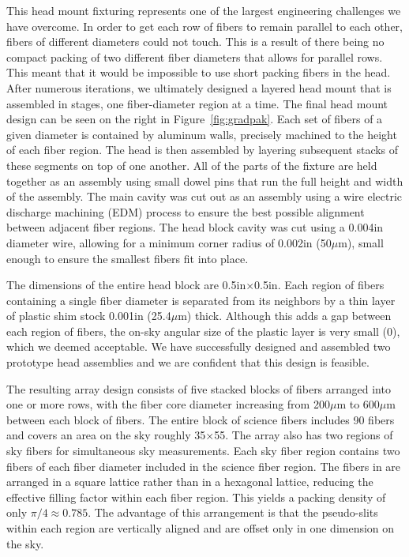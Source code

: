 This head mount fixturing represents one of the largest engineering challenges
we have overcome.  In order to get each row of fibers to remain parallel to
each other, fibers of different diameters could not touch.  This is a result
of there being no compact packing of two different fiber diameters that allows
for parallel rows.  This meant that it would be impossible to use short
packing fibers in the \GP head.  After numerous iterations, we ultimately
designed a layered head mount that is assembled in stages, one fiber-diameter
region at a time.  The final head mount design can be seen on the right in
Figure~\ref{fig:gradpak}.  Each set of fibers of a given diameter is contained
by aluminum walls, precisely machined to the height of each fiber region.  The
head is then assembled by layering subsequent stacks of these segments on top
of one another.  All of the parts of the fixture are held together as an
assembly using small dowel pins that run the full height and width of the
assembly.  The main cavity was cut out as an assembly using a wire electric
discharge machining (EDM) process to ensure the best possible alignment
between adjacent fiber regions.  The \GP head block cavity was cut using a
0.004in diameter wire, allowing for a minimum corner radius of 0.002in
(50$\mu$m), small enough to ensure the smallest fibers fit into place.

The dimensions of the entire head block are 0.5in$\times$0.5in.  Each region
of fibers containing a single fiber diameter is separated from its neighbors
by a thin layer of plastic shim stock 0.001in (25.4$\mu$m) thick.  Although
this adds a gap between each region of fibers, the on-sky angular size of the
plastic layer is very small (0), which we deemed acceptable.  We have
successfully designed and assembled two prototype \GP head assemblies and
we are confident that this design is feasible.


The resulting array design consists of five stacked blocks of fibers arranged
into one or more rows, with the fiber core diameter increasing from 200$\mu$m
to 600$\mu$m between each block of fibers.  The entire block of science fibers
includes 90 fibers and covers an area on the sky roughly
35\arcsec$\times$55\arcsec.  The array also has two regions of sky fibers for
simultaneous sky measurements.  Each sky fiber region contains two fibers of
each fiber diameter included in the science fiber region.  The fibers in
\GP are arranged in a square lattice rather than in a hexagonal lattice,
reducing the effective filling factor within each fiber region.  This yields a
packing density of only $\pi/4 \approx 0.785$.  The advantage of this
arrangement is that the pseudo-slits within each region are vertically aligned
and are offset only in one dimension on the sky.


